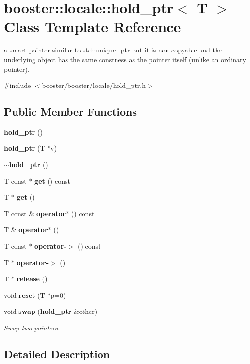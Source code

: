 \section{booster\+:\+:locale\+:\+:hold\+\_\+ptr$<$ T $>$ Class Template Reference}
\label{classbooster_1_1locale_1_1hold__ptr}


a smart pointer similar to std\+::unique\+\_\+ptr but it is non-\/copyable and the underlying object has the same constness as the pointer itself (unlike an ordinary pointer).  




{\ttfamily \#include $<$booster/booster/locale/hold\+\_\+ptr.\+h$>$}

\subsection*{Public Member Functions}
\begin{DoxyCompactItemize}
\item 
{\bf hold\+\_\+ptr} ()
\item 
{\bf hold\+\_\+ptr} (T $\ast$v)
\item 
{\bf $\sim$hold\+\_\+ptr} ()
\item 
T const $\ast$ {\bf get} () const 
\item 
T $\ast$ {\bf get} ()
\item 
T const \& {\bf operator$\ast$} () const 
\item 
T \& {\bf operator$\ast$} ()
\item 
T const $\ast$ {\bf operator-\/$>$} () const 
\item 
T $\ast$ {\bf operator-\/$>$} ()
\item 
T $\ast$ {\bf release} ()
\item 
void {\bf reset} (T $\ast$p=0)
\item 
void {\bf swap} ({\bf hold\+\_\+ptr} \&other)\label{classbooster_1_1locale_1_1hold__ptr_a087519c5a4e04ae848d04faab24e5f4c}

\begin{DoxyCompactList}\small\item\em Swap two pointers. \end{DoxyCompactList}\end{DoxyCompactItemize}


\subsection{Detailed Description}
